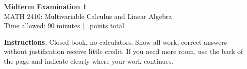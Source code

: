 \documentclass[11pt,addpoints]{exam}
\begin{document}
\begin{center}
  {\LARGE\bfseries Midterm Examination 1}\\[4pt]
  {\large MATH 2410: Multivariable Calculus and Linear Algebra}\\[4pt]
  Time allowed: 90 minutes \quad | \quad \numpoints\ points total
\end{center}

\vspace{0.6em}

\vspace{1.2em}
\noindent{}

\vspace{1.2em}
\textbf{Instructions.} Closed book, no calculators. Show all work; correct
answers without justification receive little credit. If you need more room,
use the back of the page and indicate clearly where your work continues.

\vspace{1em}
\begin{center}
  \gradetable[h][questions]
\end{center}
\end{document}
